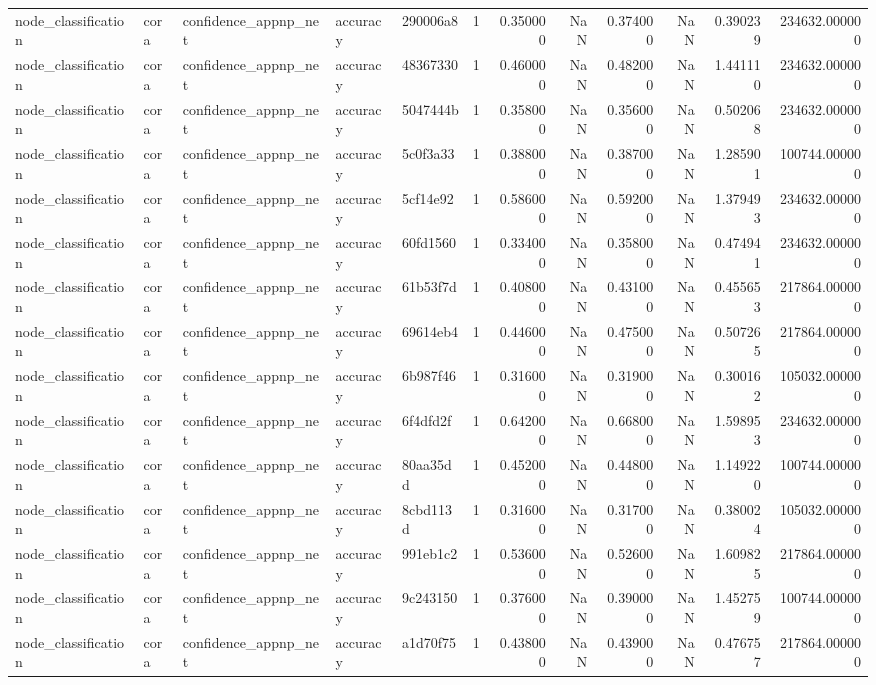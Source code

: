 \begin{tabular}{lllllrrrrrrr}
node_classification & cora & confidence_appnp_net & accuracy & 290006a8 & 1 & 0.350000 & NaN & 0.374000 & NaN & 0.390239 & 234632.000000 \\
node_classification & cora & confidence_appnp_net & accuracy & 48367330 & 1 & 0.460000 & NaN & 0.482000 & NaN & 1.441110 & 234632.000000 \\
node_classification & cora & confidence_appnp_net & accuracy & 5047444b & 1 & 0.358000 & NaN & 0.356000 & NaN & 0.502068 & 234632.000000 \\
node_classification & cora & confidence_appnp_net & accuracy & 5c0f3a33 & 1 & 0.388000 & NaN & 0.387000 & NaN & 1.285901 & 100744.000000 \\
node_classification & cora & confidence_appnp_net & accuracy & 5cf14e92 & 1 & 0.586000 & NaN & 0.592000 & NaN & 1.379493 & 234632.000000 \\
node_classification & cora & confidence_appnp_net & accuracy & 60fd1560 & 1 & 0.334000 & NaN & 0.358000 & NaN & 0.474941 & 234632.000000 \\
node_classification & cora & confidence_appnp_net & accuracy & 61b53f7d & 1 & 0.408000 & NaN & 0.431000 & NaN & 0.455653 & 217864.000000 \\
node_classification & cora & confidence_appnp_net & accuracy & 69614eb4 & 1 & 0.446000 & NaN & 0.475000 & NaN & 0.507265 & 217864.000000 \\
node_classification & cora & confidence_appnp_net & accuracy & 6b987f46 & 1 & 0.316000 & NaN & 0.319000 & NaN & 0.300162 & 105032.000000 \\
node_classification & cora & confidence_appnp_net & accuracy & 6f4dfd2f & 1 & 0.642000 & NaN & 0.668000 & NaN & 1.598953 & 234632.000000 \\
node_classification & cora & confidence_appnp_net & accuracy & 80aa35dd & 1 & 0.452000 & NaN & 0.448000 & NaN & 1.149220 & 100744.000000 \\
node_classification & cora & confidence_appnp_net & accuracy & 8cbd113d & 1 & 0.316000 & NaN & 0.317000 & NaN & 0.380024 & 105032.000000 \\
node_classification & cora & confidence_appnp_net & accuracy & 991eb1c2 & 1 & 0.536000 & NaN & 0.526000 & NaN & 1.609825 & 217864.000000 \\
node_classification & cora & confidence_appnp_net & accuracy & 9c243150 & 1 & 0.376000 & NaN & 0.390000 & NaN & 1.452759 & 100744.000000 \\
node_classification & cora & confidence_appnp_net & accuracy & a1d70f75 & 1 & 0.438000 & NaN & 0.439000 & NaN & 0.476757 & 217864.000000 \\

\end{tabular}
